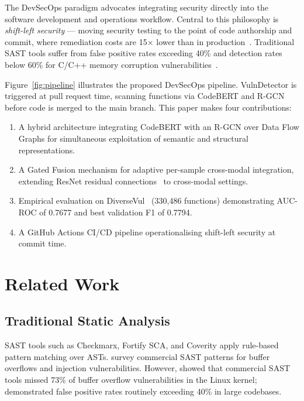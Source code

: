 \documentclass[12pt, letterpaper]{article}
\begin{document}
The DevSecOps paradigm advocates integrating security directly into the software
development and operations workflow. Central to this philosophy is
\emph{shift-left security} — moving security testing to the point of code
authorship and commit, where remediation costs are 15$\times$ lower than in
production~\citep{ibm2023}. Traditional SAST tools suffer from false positive
rates exceeding 40\% and detection rates below 60\% for C/C++ memory corruption
vulnerabilities~\citep{li2021}.

Figure~\ref{fig:pipeline} illustrates the proposed DevSecOps pipeline.
VulnDetector is triggered at pull request time, scanning functions via
CodeBERT and R-GCN before code is merged to the main branch. This paper
makes four contributions:

\begin{enumerate}[leftmargin=*,label=(\arabic*)]
  \item A hybrid architecture integrating CodeBERT with an R-GCN over Data
    Flow Graphs for simultaneous exploitation of semantic and structural
    representations.
  \item A Gated Fusion mechanism for adaptive per-sample cross-modal
    integration, extending ResNet residual connections~\citep{he2016} to
    cross-modal settings.
  \item Empirical evaluation on DiverseVul~\citep{chen2023} (330,486 functions)
    demonstrating AUC-ROC of 0.7677 and best validation F1 of 0.7794.
  \item A GitHub Actions CI/CD pipeline operationalising shift-left security
    at commit time.
\end{enumerate}



\section{Related Work}

\subsection{Traditional Static Analysis}

SAST tools such as Checkmarx, Fortify SCA, and Coverity apply rule-based
pattern matching over ASTs. \citet{dowd2006} survey commercial SAST patterns
for buffer overflows and injection vulnerabilities. However, \citet{zitser2004}
showed that commercial SAST tools missed 73\% of buffer overflow
vulnerabilities in the Linux kernel; \citet{scandariato2014} demonstrated
false positive rates routinely exceeding 40\% in large codebases.
\end{document}
